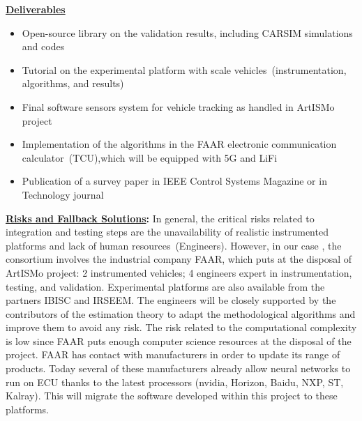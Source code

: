 \documentclass[a4paper,11pt]{article}
\begin{document}
\begin{tcolorbox}[breakable, enhanced,  colback=yellow!2!white,
title = \bf Deliverables$-$Risks and Fallback Solutions, coltitle= black, colbacktitle=yellow!7!white, halign title=center]

{ \bf \underline{Deliverables}}

\begin{itemize}[leftmargin=.2in,noitemsep,nolistsep]
\item Open-source library on the validation results, including CARSIM simulations and codes
\item Tutorial on the experimental platform with scale vehicles~(instrumentation, algorithms, and results)
\item Final software sensors system for vehicle tracking as handled in ArtISMo project
\item Implementation of the algorithms in the FAAR electronic communication calculator~(TCU),which will be equipped with 5G and LiFi
\item Publication of a survey paper in IEEE Control Systems Magazine or in Technology journal %
\end{itemize}

{ \bf \underline{Risks and Fallback Solutions}:} In general, the critical risks related to integration and testing steps are the unavailability of realistic instrumented platforms and lack of human resources~(Engineers). However, in our case , the consortium involves the industrial company FAAR, which puts at the disposal of ArtISMo project: 2 instrumented vehicles; 4 engineers expert in instrumentation, testing, and validation. Experimental platforms are also available from the partners IBISC and IRSEEM. The engineers will be closely supported by the contributors of the estimation theory to adapt the methodological algorithms and improve them to avoid any risk. The risk related to the computational complexity is low since FAAR puts enough computer science resources at the disposal of the project. FAAR has contact with manufacturers in order to update its range of products. Today several of these manufacturers already allow neural networks to run on ECU thanks to the latest processors (nvidia, Horizon, Baidu, NXP, ST, Kalray). This will migrate the software developed within this project to these platforms.
%
\end{tcolorbox}
\end{document}
